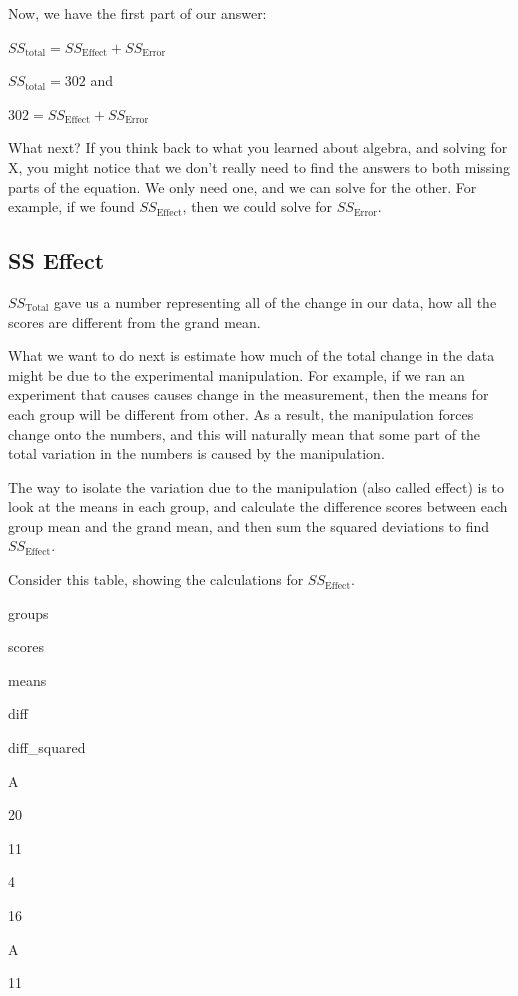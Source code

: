 \documentclass[
]{book}
\begin{document}
Now, we have the first part of our answer:

\(SS_\text{total} = SS_\text{Effect} + SS_\text{Error}\)

\(SS_\text{total} = 302\) and

\(302 = SS_\text{Effect} + SS_\text{Error}\)

What next? If you think back to what you learned about algebra, and solving for X, you might notice that we don't really need to find the answers to both missing parts of the equation. We only need one, and we can solve for the other. For example, if we found \(SS_\text{Effect}\), then we could solve for \(SS_\text{Error}\).

\hypertarget{ss-effect}{%
\subsection{SS Effect}\label{ss-effect}}

\(SS_\text{Total}\) gave us a number representing all of the change in our data, how all the scores are different from the grand mean.

What we want to do next is estimate how much of the total change in the data might be due to the experimental manipulation. For example, if we ran an experiment that causes causes change in the measurement, then the means for each group will be different from other. As a result, the manipulation forces change onto the numbers, and this will naturally mean that some part of the total variation in the numbers is caused by the manipulation.

The way to isolate the variation due to the manipulation (also called effect) is to look at the means in each group, and calculate the difference scores between each group mean and the grand mean, and then sum the squared deviations to find \(SS_\text{Effect}\).

Consider this table, showing the calculations for \(SS_\text{Effect}\).

groups

scores

means

diff

diff\_squared

A

20

11

4

16

A

11
\end{document}
